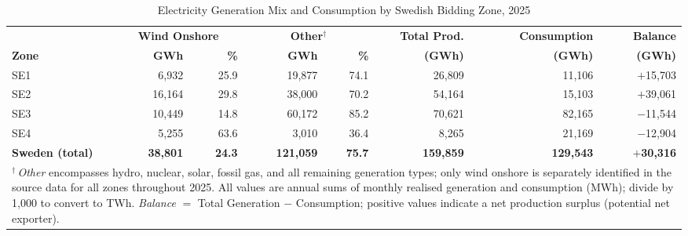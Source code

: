 \begin{table}[htbp]
\centering
\caption{Electricity Generation Mix and Consumption by Swedish Bidding Zone, 2025}
\label{tab:production_consumption_mix_2025}
\begin{tabular}{lrrrrrrr}
\toprule
 & \multicolumn{2}{c}{\textbf{Wind Onshore}} & \multicolumn{2}{c}{\textbf{Other$^\dagger$}} & \textbf{Total Prod.} & \textbf{Consumption} & \textbf{Balance} \\
\cmidrule(lr){2-3}\cmidrule(lr){4-5}
\textbf{Zone} & \textbf{GWh} & \textbf{\%} & \textbf{GWh} & \textbf{\%} & \textbf{(GWh)} & \textbf{(GWh)} & \textbf{(GWh)} \\
\midrule
SE1 & 6,932 & 25.9 & 19,877 & 74.1 & 26,809 & 11,106 & $+$15,703 \\
SE2 & 16,164 & 29.8 & 38,000 & 70.2 & 54,164 & 15,103 & $+$39,061 \\
SE3 & 10,449 & 14.8 & 60,172 & 85.2 & 70,621 & 82,165 & $-$11,544 \\
SE4 & 5,255 & 63.6 & 3,010 & 36.4 & 8,265 & 21,169 & $-$12,904 \\
\midrule
\textbf{Sweden (total)} & \textbf{38,801} & \textbf{24.3} & \textbf{121,059} & \textbf{75.7} & \textbf{159,859} & \textbf{129,543} & $+$\textbf{30,316} \\
\bottomrule
\multicolumn{8}{p{0.99\linewidth}}{\footnotesize
  $^\dagger$\,\textit{Other} encompasses hydro, nuclear, solar, fossil gas, and all remaining
  generation types; only wind onshore is separately identified in the source data for all zones
  throughout 2025. All values are annual sums of monthly realised generation and consumption
  (MWh); divide by 1{,}000 to convert to TWh.
  \textit{Balance} $=$ Total Generation $-$ Consumption; positive values indicate a net
  production surplus (potential net exporter).}
\end{tabular}
\end{table}
